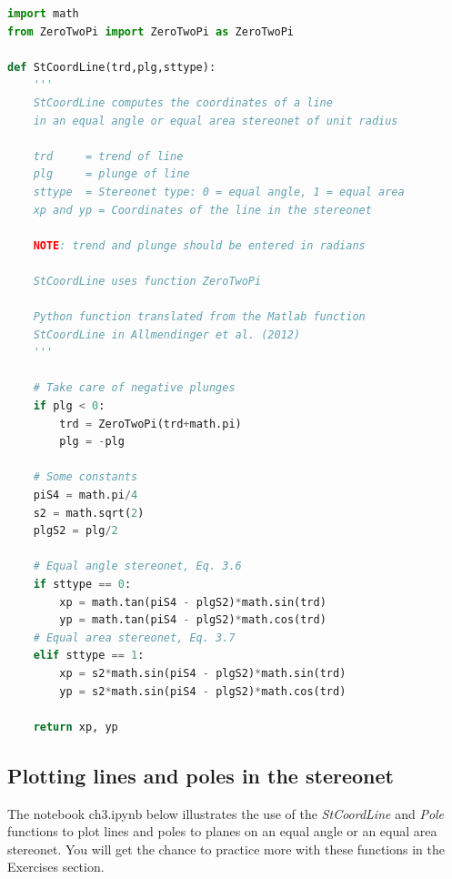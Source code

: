 \documentclass[a4paper , 12pt]{book}
\begin{document}
\begin{center}
\begin{lstlisting}[language=Python, frame=single]
import math
from ZeroTwoPi import ZeroTwoPi as ZeroTwoPi

def StCoordLine(trd,plg,sttype):
    '''
    StCoordLine computes the coordinates of a line 
    in an equal angle or equal area stereonet of unit radius
    
    trd  	= trend of line
    plg  	= plunge of line
    sttype 	= Stereonet type: 0 = equal angle, 1 = equal area
    xp and yp = Coordinates of the line in the stereonet

    NOTE: trend and plunge should be entered in radians

    StCoordLine uses function ZeroTwoPi
    
    Python function translated from the Matlab function 
    StCoordLine in Allmendinger et al. (2012)
    '''
    
    # Take care of negative plunges
    if plg < 0:
        trd = ZeroTwoPi(trd+math.pi)
        plg = -plg
        
    # Some constants
    piS4 = math.pi/4
    s2 = math.sqrt(2)
    plgS2 = plg/2
        
    # Equal angle stereonet, Eq. 3.6
    if sttype == 0:
        xp = math.tan(piS4 - plgS2)*math.sin(trd)
        yp = math.tan(piS4 - plgS2)*math.cos(trd)
    # Equal area stereonet, Eq. 3.7
    elif sttype == 1:
        xp = s2*math.sin(piS4 - plgS2)*math.sin(trd)
        yp = s2*math.sin(piS4 - plgS2)*math.cos(trd)
    
    return xp, yp
\end{lstlisting}   
\end{center}

\subsection{Plotting lines and poles in the stereonet}
The notebook ch3.ipynb below illustrates the use of the \textit{StCoordLine} and \textit{Pole} functions to plot lines and poles to planes on an equal angle or an equal area stereonet. You will get the chance to practice more with these functions in the Exercises section.
\end{document}
